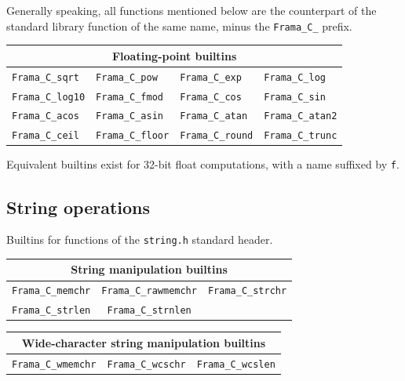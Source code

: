 \documentclass[web]{frama-c-book}
\begin{document}
Generally speaking, all functions mentioned below are the counterpart of the
standard library function of the same name, minus the
\lstinline|Frama_C_| prefix.

\begin{table}[!ht]
  \centering
  \begin{tabular}{llll}
    \multicolumn{4}{c}{Floating-point builtins} \\
    \hline
    \lstinline|Frama_C_sqrt| &
    \lstinline|Frama_C_pow| &
    \lstinline|Frama_C_exp| &
    \lstinline|Frama_C_log| \\
    \lstinline|Frama_C_log10| &
    \lstinline|Frama_C_fmod| &
    \lstinline|Frama_C_cos| &
    \lstinline|Frama_C_sin| \\
    \lstinline|Frama_C_acos| &
    \lstinline|Frama_C_asin| &
    \lstinline|Frama_C_atan| &
    \lstinline|Frama_C_atan2| \\
    \lstinline|Frama_C_ceil| &
    \lstinline|Frama_C_floor| &
    \lstinline|Frama_C_round| &
    \lstinline|Frama_C_trunc|
  \end{tabular}
\end{table}
Equivalent builtins exist for 32-bit float computations, with a name suffixed
by \lstinline|f|.

\subsection{String operations}

Builtins for functions of the \lstinline|string.h| standard header.

\begin{table}[!ht]
  \centering
  \begin{tabular}{ccc}
    \multicolumn{3}{c}{String manipulation builtins} \\
    \hline
    \lstinline|Frama_C_memchr| &
    \lstinline|Frama_C_rawmemchr| &
    \lstinline|Frama_C_strchr| \\
    \lstinline|Frama_C_strlen| &
    \lstinline|Frama_C_strnlen|
  \end{tabular}
\end{table}

\begin{table}[!ht]
  \centering
  \begin{tabular}{ccc}
    \multicolumn{3}{c}{Wide-character string manipulation builtins} \\
    \hline
    \lstinline|Frama_C_wmemchr| &
    \lstinline|Frama_C_wcschr| &
    \lstinline|Frama_C_wcslen|
  \end{tabular}
\end{table}
\end{document}
